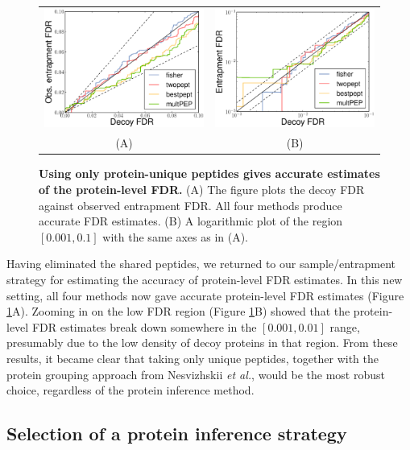 \documentclass{article}
\begin{document}
\begin{figure}
\begin{center}
\begin{tabular}{cc} 
\includegraphics[width=0.45\linewidth]{./img/unique-pept-accuracy} &
\includegraphics[width=0.45\linewidth]{./img/unique-pept-accuracy-log}
\\
(A) & (B)
\end{tabular}
\caption{\label{fig:unique-accuracy}\textbf{Using only protein-unique
    peptides gives accurate estimates of the protein-level FDR.}  (A)
  The figure plots the decoy FDR against observed entrapment FDR.  All
  four methods produce accurate FDR estimates. (B) A logarithmic plot
  of the region $[0.001, 0.1]$ with the same axes as in (A).}
\end{center}
\end{figure}

Having eliminated the shared peptides, we returned to our
sample/entrapment strategy for estimating the accuracy of
protein-level FDR estimates.  In this new setting, all four methods
now gave accurate protein-level FDR estimates (Figure
\ref{fig:unique-accuracy}A).  Zooming in on the low FDR region (Figure
\ref{fig:unique-accuracy}B) showed that the protein-level FDR
estimates break down somewhere in the $[0.001, 0.01]$ range,
presumably due to the low density of decoy proteins in that region.
From these results, it became clear that taking only unique peptides,
together with the protein grouping approach from Nesvizhskii {\em et
  al.}, would be the most robust choice, regardless of the protein
inference method.


\subsection*{Selection of a protein inference strategy}
\end{document}
